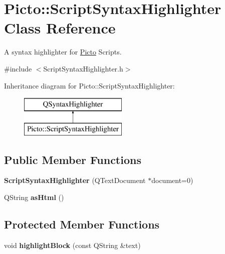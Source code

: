 \hypertarget{class_picto_1_1_script_syntax_highlighter}{\section{Picto\-:\-:Script\-Syntax\-Highlighter Class Reference}
\label{class_picto_1_1_script_syntax_highlighter}
}


A syntax highlighter for \hyperlink{namespace_picto}{Picto} Scripts.  




{\ttfamily \#include $<$Script\-Syntax\-Highlighter.\-h$>$}

Inheritance diagram for Picto\-:\-:Script\-Syntax\-Highlighter\-:\begin{figure}[H]
\begin{center}
\leavevmode
\includegraphics[height=2.000000cm]{class_picto_1_1_script_syntax_highlighter}
\end{center}
\end{figure}
\subsection*{Public Member Functions}
\begin{DoxyCompactItemize}
\item 
\hypertarget{class_picto_1_1_script_syntax_highlighter_ae99d243742b591fbe369ed4ce58daa9d}{{\bfseries Script\-Syntax\-Highlighter} (Q\-Text\-Document $\ast$document=0)}\label{class_picto_1_1_script_syntax_highlighter_ae99d243742b591fbe369ed4ce58daa9d}

\item 
\hypertarget{class_picto_1_1_script_syntax_highlighter_a7744ae2cbe4faffab49533677a893f3b}{Q\-String {\bfseries as\-Html} ()}\label{class_picto_1_1_script_syntax_highlighter_a7744ae2cbe4faffab49533677a893f3b}

\end{DoxyCompactItemize}
\subsection*{Protected Member Functions}
\begin{DoxyCompactItemize}
\item 
\hypertarget{class_picto_1_1_script_syntax_highlighter_acb904895af1627266c3b05150e09abc0}{void {\bfseries highlight\-Block} (const Q\-String \&text)}\label{class_picto_1_1_script_syntax_highlighter_acb904895af1627266c3b05150e09abc0}

\end{DoxyCompactItemize}


